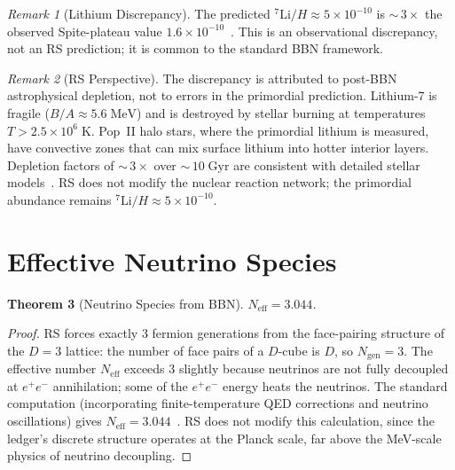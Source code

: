 \documentclass[12pt,a4paper]{article}
\newtheorem{theorem}{Theorem}[section]
\theoremstyle{definition}
\theoremstyle{remark}
\newtheorem{remark}[theorem]{Remark}
\begin{document}
\begin{remark}[Lithium Discrepancy]
The predicted ${}^7\mathrm{Li}/H \approx 5 \times 10^{-10}$ is
${\sim}\,3\times$ the observed Spite-plateau value
$1.6 \times 10^{-10}$~\cite{Spite1982}.  This is an observational
discrepancy, not an RS prediction; it is common to the standard BBN
framework.
\end{remark}

\begin{remark}[RS Perspective]
The discrepancy is attributed to post-BBN astrophysical depletion,
not to errors in the primordial prediction.  Lithium-7 is fragile
($B/A \approx 5.6\;\mathrm{MeV}$) and is destroyed by stellar
burning at temperatures $T > 2.5 \times 10^6\;\mathrm{K}$.
Pop~II halo stars, where the primordial lithium is measured, have
convective zones that can mix surface lithium into hotter interior
layers.  Depletion factors of ${\sim}\,3\times$ over
${\sim}\,10\;\mathrm{Gyr}$ are consistent with detailed stellar
models~\cite{Korn2006}.  RS does not modify the nuclear reaction
network; the primordial abundance remains
${}^7\mathrm{Li}/H \approx 5 \times 10^{-10}$.
\end{remark}

\section{Effective Neutrino Species}
\label{sec:neff}

\begin{theorem}[Neutrino Species from BBN]
$N_{\mathrm{eff}} = 3.044$.
\end{theorem}

\begin{proof}
RS forces exactly 3 fermion generations from the face-pairing
structure of the $D = 3$ lattice: the number of face pairs of a
$D$-cube is $D$, so $N_{\mathrm{gen}} = 3$.  The effective number
$N_{\mathrm{eff}}$ exceeds 3 slightly because neutrinos are not
fully decoupled at $e^+e^-$ annihilation; some of the $e^+e^-$
energy heats the neutrinos.  The standard computation
(incorporating finite-temperature QED corrections and neutrino
oscillations) gives $N_{\mathrm{eff}} = 3.044$~\cite{Mangano2005}.
RS does not modify this calculation, since the ledger's discrete
structure operates at the Planck scale, far above the MeV-scale
physics of neutrino decoupling.
\end{proof}
\end{document}
